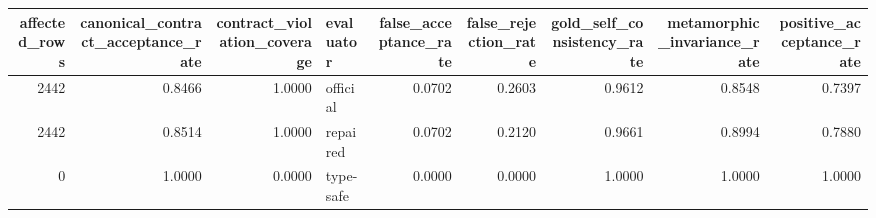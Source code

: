 \begin{tabular}{rrrlrrrrr}
\toprule
affected\_rows & canonical\_contract\_acceptance\_rate & contract\_violation\_coverage & evaluator & false\_acceptance\_rate & false\_rejection\_rate & gold\_self\_consistency\_rate & metamorphic\_invariance\_rate & positive\_acceptance\_rate \\
\midrule
2442 & 0.8466 & 1.0000 & official & 0.0702 & 0.2603 & 0.9612 & 0.8548 & 0.7397 \\
2442 & 0.8514 & 1.0000 & repaired & 0.0702 & 0.2120 & 0.9661 & 0.8994 & 0.7880 \\
0 & 1.0000 & 0.0000 & type-safe & 0.0000 & 0.0000 & 1.0000 & 1.0000 & 1.0000 \\
\bottomrule
\end{tabular}
